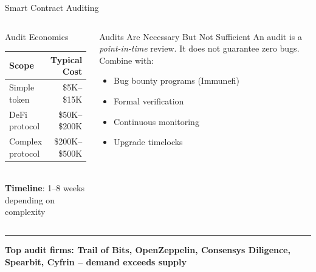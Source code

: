 \documentclass[8pt,aspectratio=169]{beamer}
\newcommand{\bottomnote}[1]{\vfill\vspace{-2mm}\textcolor{mllavender2}{\rule{\textwidth}{0.4pt}}\vspace{1mm}\footnotesize\textbf{#1}}
\begin{document}
\begin{frame}{Smart Contract Auditing}
\begin{center}
\end{center}
\vspace{2mm}
\begin{columns}
\begin{block}{Audit Economics}
\small
\begin{tabular}{@{}lr@{}}
\toprule
\textbf{Scope} & \textbf{Typical Cost} \\
\midrule
Simple token & \$5K--\$15K \\
DeFi protocol & \$50K--\$200K \\
Complex protocol & \$200K--\$500K \\
\bottomrule
\end{tabular}\\[2mm]
\textbf{Timeline}: 1--8 weeks depending on complexity
\end{block}
\begin{alertblock}{Audits Are Necessary But Not Sufficient}
\small An audit is a \emph{point-in-time} review. It does not guarantee zero bugs. Combine with:
\begin{itemize}\small
  \item Bug bounty programs (Immunefi)
  \item Formal verification
  \item Continuous monitoring
  \item Upgrade timelocks
\end{itemize}
\end{alertblock}
\end{columns}
\bottomnote{Top audit firms: Trail of Bits, OpenZeppelin, Consensys Diligence, Spearbit, Cyfrin -- demand exceeds supply}
\end{frame}
\end{document}
